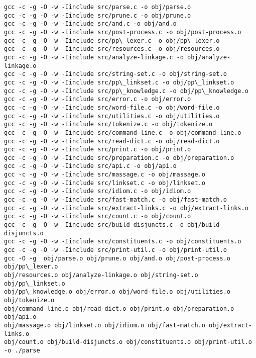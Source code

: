 \documentclass[11pt]{article}
\begin{document}
    \begin{Verbatim}[commandchars=\\\{\},fontsize=\footnotesize]
gcc -c -g -O -w -Iinclude src/parse.c -o obj/parse.o
gcc -c -g -O -w -Iinclude src/prune.c -o obj/prune.o
gcc -c -g -O -w -Iinclude src/and.c -o obj/and.o
gcc -c -g -O -w -Iinclude src/post-process.c -o obj/post-process.o
gcc -c -g -O -w -Iinclude src/pp\_lexer.c -o obj/pp\_lexer.o
gcc -c -g -O -w -Iinclude src/resources.c -o obj/resources.o
gcc -c -g -O -w -Iinclude src/analyze-linkage.c -o obj/analyze-linkage.o
gcc -c -g -O -w -Iinclude src/string-set.c -o obj/string-set.o
gcc -c -g -O -w -Iinclude src/pp\_linkset.c -o obj/pp\_linkset.o
gcc -c -g -O -w -Iinclude src/pp\_knowledge.c -o obj/pp\_knowledge.o
gcc -c -g -O -w -Iinclude src/error.c -o obj/error.o
gcc -c -g -O -w -Iinclude src/word-file.c -o obj/word-file.o
gcc -c -g -O -w -Iinclude src/utilities.c -o obj/utilities.o
gcc -c -g -O -w -Iinclude src/tokenize.c -o obj/tokenize.o
gcc -c -g -O -w -Iinclude src/command-line.c -o obj/command-line.o
gcc -c -g -O -w -Iinclude src/read-dict.c -o obj/read-dict.o
gcc -c -g -O -w -Iinclude src/print.c -o obj/print.o
gcc -c -g -O -w -Iinclude src/preparation.c -o obj/preparation.o
gcc -c -g -O -w -Iinclude src/api.c -o obj/api.o
gcc -c -g -O -w -Iinclude src/massage.c -o obj/massage.o
gcc -c -g -O -w -Iinclude src/linkset.c -o obj/linkset.o
gcc -c -g -O -w -Iinclude src/idiom.c -o obj/idiom.o
gcc -c -g -O -w -Iinclude src/fast-match.c -o obj/fast-match.o
gcc -c -g -O -w -Iinclude src/extract-links.c -o obj/extract-links.o
gcc -c -g -O -w -Iinclude src/count.c -o obj/count.o
gcc -c -g -O -w -Iinclude src/build-disjuncts.c -o obj/build-disjuncts.o
gcc -c -g -O -w -Iinclude src/constituents.c -o obj/constituents.o
gcc -c -g -O -w -Iinclude src/print-util.c -o obj/print-util.o
gcc -O -g  obj/parse.o obj/prune.o obj/and.o obj/post-process.o obj/pp\_lexer.o
obj/resources.o obj/analyze-linkage.o obj/string-set.o obj/pp\_linkset.o
obj/pp\_knowledge.o obj/error.o obj/word-file.o obj/utilities.o obj/tokenize.o
obj/command-line.o obj/read-dict.o obj/print.o obj/preparation.o obj/api.o
obj/massage.o obj/linkset.o obj/idiom.o obj/fast-match.o obj/extract-links.o
obj/count.o obj/build-disjuncts.o obj/constituents.o obj/print-util.o  -o ./parse

    \end{Verbatim}
\end{document}
